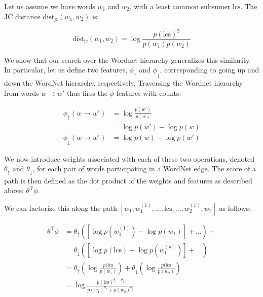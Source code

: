 

%
%
Let us assume we have words $w_1$ and $w_2$, with a least common subsumer $\textrm{lcs}$.
The JC distance $\textrm{dist}_{\textrm{jc}}(w_1, w_2)$ is:

\begin{equation}
\textrm{dist}_{\textrm{jc}}(w_1, w_2)
  = \log\frac{p(\textrm{lcs})^2}{p(w_1)p(w_2)}
\end{equation}

We show that our search over the Wordnet hierarchy generalizes this similarity.
In particular, let us define two features, $\phi_\uparrow$ and $\phi_\downarrow$,
  corresponding to going up and down the WordNet hierarchy, respectively.
Traversing the Wordnet hierarchy from words $w \rightarrow w'$ thus fires the $\phi$
  features with counts:

\begin{align*}
  \phi_\uparrow(w \rightarrow w')
    &= \log\frac{p(w')}{p(w)} \\
    &= \log p(w') - \log p(w) \\
  \phi_\downarrow(w \rightarrow w')
    &= \log p(w) - \log p(w') 
\end{align*}

We now introduce weights associated with each of these two operations, denoted
  $\theta_\uparrow$ and $\theta_\downarrow$, for each pair of words participating
  in a WordNet edge.
The score of a path is then defined as the dot product of the weights and features
  as described above: $\theta^{\textrm{T}}\phi$.

We can factorize this along the path
  $[w_1, w_1^{(1)}, \dots, \textrm{lcs}, \dots,  w_2^{(1)}, w_2]$
  as follows:

\begin{align*}
\theta^{\textrm{T}}\phi
  &= \theta_\uparrow \left( 
    \left[\log p(w_1^{(1)}) - \log p(w_1)\right] +
    \dots
    \right) + \\
  &~~~~~~ \theta_\downarrow \left( 
    \left[\log p(\textrm{lcs}) - \log p(w_1^{(n)}) \right] +
    \dots
    \right) \\
  &= \theta_\uparrow \left( \log \frac{p(\textrm{lcs}}{p(w_1)} \right) +
     \theta_\downarrow \left( \log \frac{p(\textrm{lcs}}{p(w_2)} \right) \\
  &= \log \frac{ p(\textrm{lcs})^{\theta_\uparrow + \theta_\downarrow} }
               { p(w_1)^{\theta_\uparrow} + p(w_2)^{\theta_\downarrow} }
\end{align*}

